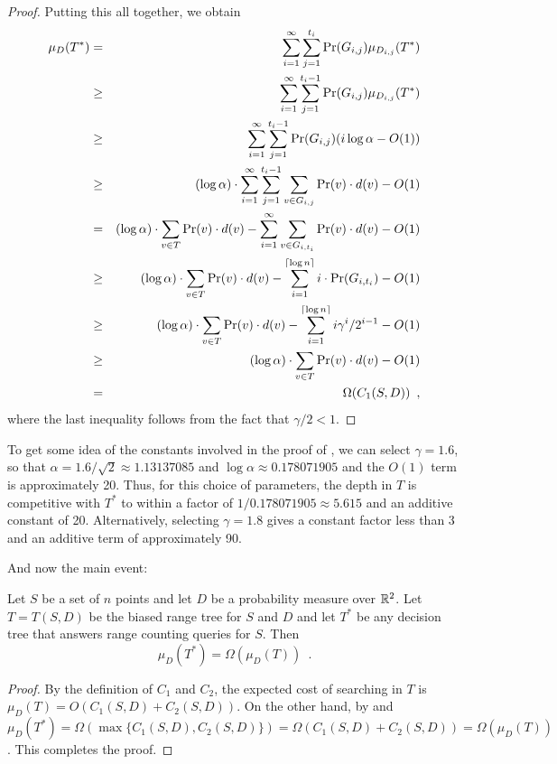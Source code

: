 \documentclass[lotsofwhite,charterfonts]{patmorin}
\newcommand{\depth}{d}
\begin{document}
\begin{proof}
Putting this all together, we obtain
\begin{eqnarray*}
\mu_D(T^*) 
  & = & \sum_{i=1}^{\infty}\sum_{j=1}^{t_i}\Pr(G_{i,j})\mu_{D_{i,j}}(T^*) \\
  & \ge & \sum_{i=1}^{\infty}
    \sum_{j=1}^{t_i-1}\Pr(G_{i,j})\mu_{D_{i,j}}(T^*) \\
  & \ge & \sum_{i=1}^{\infty}\sum_{j=1}^{t_i-1}
           \Pr(G_{i,j})( i\log\alpha -O(1)) \\
  & \ge & (\log\alpha)\cdot
         \sum_{i=1}^{\infty}\sum_{j=1}^{t_i-1}
		\sum_{v\in G_{i,j}}\Pr(v)\cdot\depth(v) - O(1)\\
  & = & (\log\alpha)\cdot\sum_{v\in T}\Pr(v)\cdot \depth(v)
          -    \sum_{i=1}^{\infty}
		\sum_{v\in G_{i,t_i}}\Pr(v)\cdot\depth(v) - O(1)\\
  & \ge & (\log\alpha)\cdot\sum_{v\in T}\Pr(v)\cdot \depth(v)
          -    \sum_{i=1}^{\ceil{\log n}}i\cdot\Pr(G_{i,t_i}) - O(1) \\
  & \ge & (\log\alpha)\cdot\sum_{v\in T}\Pr(v)\cdot \depth(v)
          -    \sum_{i=1}^{\ceil{\log n}}i\gamma^i/2^{i-1} - O(1) \\
  & \ge &  (\log\alpha)\cdot\sum_{v\in T}\Pr(v)\cdot \depth(v) - O(1) \\
  & = & \Omega(C_1(S,D)) \enspace ,
\end{eqnarray*}
where the last inequality follows from the fact that $\gamma/2 < 1$. 
\end{proof}

To get some idea of the constants involved in the proof of
, we can select $\gamma=1.6$, so that
$\alpha=1.6/\sqrt{2}\approx 1.13137085$ and $\log \alpha \approx
0.178071905$ and the $O(1)$ term is approximately 20.  Thus, for this
choice of parameters, the depth in $T$ is competitive with $T^*$ to
within a factor of $1/0.178071905\approx 5.615$ and an additive
constant of 20.  Alternatively, selecting $\gamma=1.8$ gives a
constant factor less than 3 and an additive term of approximately 90.

And now the main event:

\begin{thm}
Let $S$ be a set of $n$ points and let $D$ be a probability measure
over $\mathbb{R}^2$.
Let $T=T(S,D)$ be the biased range tree for $S$ and $D$ and 
let $T^*$ be any decision
tree that answers range counting queries for $S$.  Then
\[
  \mu_D(T^*) = \Omega(\mu_D(T)) \enspace .
\]
\end{thm}

\begin{proof}
By the definition of $C_1$ and $C_2$, the expected cost of searching in
$T$ is $\mu_D(T)=O(C_1(S,D)+C_2(S,D))$.  On the other hand, by
 and  $\mu_D(T^*) =
\Omega(\max\{C_1(S,D),C_2(S,D)\}) =
\Omega(C_1(S,D)+C_2(S,D))=\Omega(\mu_D(T))$.  This completes the proof.
\end{proof}
\end{document}
